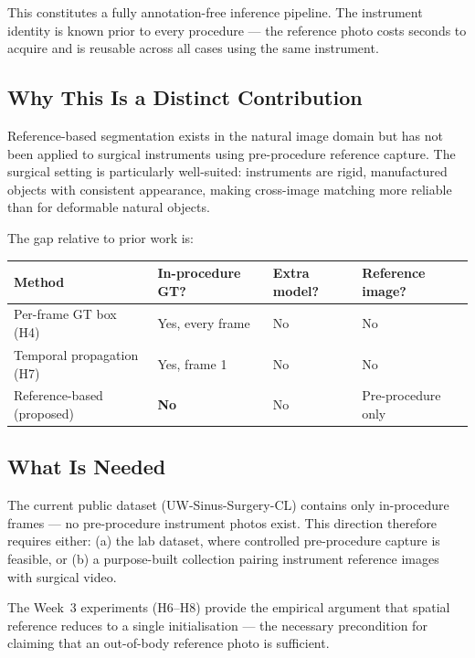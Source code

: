 \documentclass[11pt, a4paper]{article}
\begin{document}
\noindent This constitutes a fully annotation-free inference pipeline.
The instrument identity is known prior to every procedure --- the reference
photo costs seconds to acquire and is reusable across all cases using
the same instrument.

\subsection{Why This Is a Distinct Contribution}

Reference-based segmentation exists in the natural image domain but has not
been applied to surgical instruments using pre-procedure reference capture.
The surgical setting is particularly well-suited: instruments are rigid,
manufactured objects with consistent appearance, making cross-image matching
more reliable than for deformable natural objects.

The gap relative to prior work is:

\begin{center}
\begin{tabular}{p{3.5cm} C{2cm} C{2cm} C{2cm}}
\toprule
\textbf{Method} & \textbf{In-procedure GT?} & \textbf{Extra model?} & \textbf{Reference image?} \\
\midrule
Per-frame GT box (H4)              & Yes, every frame & No  & No \\
Temporal propagation (H7)          & Yes, frame 1     & No  & No \\
Reference-based (proposed)         & \textbf{No}      & No  & Pre-procedure only \\
\bottomrule
\end{tabular}
\end{center}

\subsection{What Is Needed}

The current public dataset (UW-Sinus-Surgery-CL) contains only in-procedure
frames --- no pre-procedure instrument photos exist.
This direction therefore requires either:
(a) the lab dataset, where controlled pre-procedure capture is feasible, or
(b) a purpose-built collection pairing instrument reference images with
    surgical video.

The Week~3 experiments (H6--H8) provide the empirical argument that spatial
reference reduces to a single initialisation --- the necessary precondition
for claiming that an out-of-body reference photo is sufficient.
\end{document}
